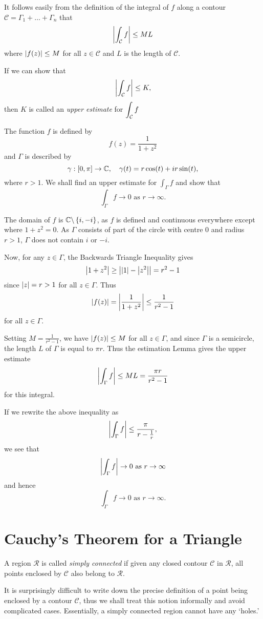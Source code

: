It follows easily from the definition of the integral of $f$ along a contour $\mathcal{C}=\Gamma_1 + \ldots + \Gamma_n$ that 
\[
\left| \int_{\mathcal{C}} f \right| \leq M L
\]
where $\left| f(z) \right| \leq M$ for all $z \in \mathcal{C}$ and $L$ is the length of $\mathcal{C}$.
\begin{note}
If we can show that
\[
\left|  \int_{\mathcal{C}} f  \right| \leq K,
\]
then $K$ is called an \emph{upper estimate} for $\displaystyle \int_{\mathcal{C}} f$
\end{note}
\begin{example}
\label{e:estimation}
The function $f$ is defined by
\[
f(z) = \frac{1}{1+z^2}
\]
and $\Gamma$ is described by \[ \gamma:[0,\pi] \to \mathbb{C}, \quad \gamma(t) = r \cos (t) +i r \sin (t), \]
where $r>1$.  We shall find an upper estimate for $\int_{\Gamma} f$ and show that
\[
\int_{\Gamma} f \to 0 \text{ as } r \to \infty.
\]
\end{example}
\begin{solution}
The domain of $f$ is $\mathbb{C} \backslash \left\{i,-i\right\}$, as $f$ is defined and continuous everywhere except where $1+z^2=0$.  As $\Gamma$ consists of part of the circle with centre $0$ and radius $r>1$, $\Gamma$ does not contain $i$ or $-i$.

Now, for any $z \in \Gamma$, the Backwards Triangle Inequality gives
\[
\left| 1+z^2 \right| \geq \left| \left| 1 \right|-\left| z^2 \right| \right| = r^2-1
\]
since $\left| z \right|=r>1$ for all $z \in \Gamma$.  Thus
\[
\left| f(z) \right| = \left| \frac{1}{1+z^2} \right| \leq \frac{1}{r^2-1}
\]
for all $z \in \Gamma$.

Setting $M = \frac{1}{r^2-1}$, we have $\left| f(z) \right| \leq M$ for all $z \in \Gamma$, and since $\Gamma$ is a semicircle, the length $L$ of $\Gamma$ is equal to $\pi r$.  Thus the estimation Lemma gives the upper estimate
\[
\left|  \int_{\Gamma} f  \right| \leq ML = \frac{\pi r}{r^2-1}
\]
for this integral.

If we rewrite the above inequality as
\[
\left|  \int_{\Gamma} f  \right| \leq \frac{\pi}{r-\frac{1}{r}},
\]
we see that
\[
\left| \int_{\Gamma} f  \right| \to 0 \text{ as } r \to \infty
\]
and hence
\[
 \int_{\Gamma} f \to 0 \text{ as } r \to \infty.
\]

\end{solution}
\section{Cauchy's Theorem for a Triangle}
\begin{definition}
A region $\mathcal{R}$ is called \emph{simply connected} if given any closed contour $\mathcal{C}$ in $\mathcal{R}$, all points enclosed by $\mathcal{C}$ also belong to $\mathcal{R}$.
\end{definition}
It is surprisingly difficult to write down the precise definition of a point being enclosed by a contour $\mathcal{C}$, thus we shall treat this notion informally and avoid complicated cases.  Essentially, a simply connected region cannot have any `holes.'

